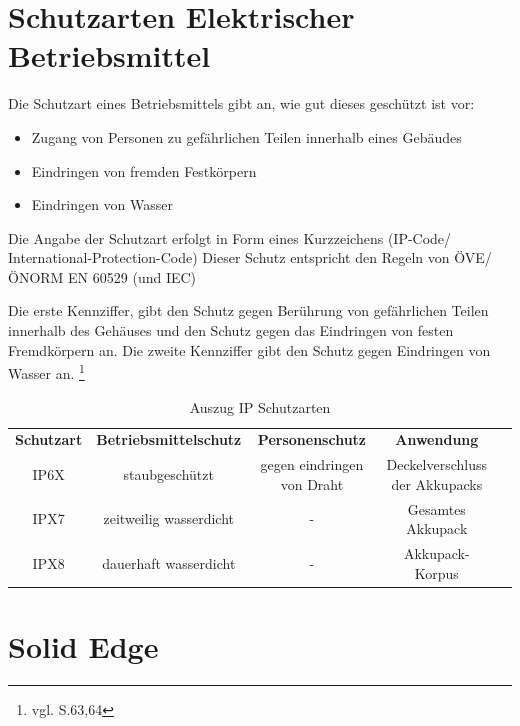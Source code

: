 \newpage

\section{Schutzarten Elektrischer Betriebsmittel} 

Die Schutzart eines Betriebsmittels gibt an, wie gut dieses geschützt ist vor:
\begin{itemize}
	\item Zugang von Personen zu gefährlichen Teilen innerhalb eines Gebäudes
	\item Eindringen von fremden Festkörpern
	\item Eindringen von Wasser
\end{itemize}
 
Die Angabe der Schutzart erfolgt in Form eines Kurzzeichens (IP-Code/ International-Protection-Code)
Dieser Schutz entspricht den Regeln von ÖVE/ÖNORM EN 60529 (und IEC)

Die erste Kennziffer, gibt den Schutz gegen Berührung von gefährlichen Teilen innerhalb des Gehäuses und den Schutz gegen das Eindringen von festen Fremdkörpern an.
Die zweite Kennziffer gibt den Schutz gegen Eindringen von Wasser an. \footnote{vgl. \cite{IPSchutzarten} S.63,64}

\begin{table}[H]
	\begin{tabular}{|c|c|c|c|l}
\cline{1-4}
		\textbf{Schutzart} & \textbf{Betriebsmittelschutz} & \textbf{Personenschutz}    & \textbf{Anwendung}             &  \\ \cline{1-4}
		IP6X               & staubgeschützt                & gegen eindringen von Draht & Deckelverschluss der Akkupacks &  \\ \cline{1-4}
		IPX7               & zeitweilig wasserdicht        & -                          & Gesamtes Akkupack              &  \\ \cline{1-4}
		IPX8               & dauerhaft wasserdicht         & -                          & Akkupack-Korpus                &  \\ \cline{1-4}
	\end{tabular}
	\caption{Auszug IP Schutzarten}
\end{table}


\newpage

\section{Solid Edge}



